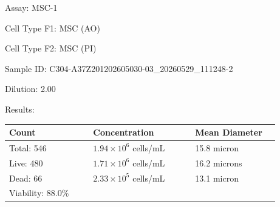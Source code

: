 \documentclass[UTF8,10pt,a4paper,fontset=fandol]{ctexart}
\newcommand{\fieldvalue}[1]{#1}
\begin{document}
\newpage

\noindent
Assay: 
\fieldvalue{MSC-1}

\medskip
\noindent
Cell Type F1: 
\fieldvalue{MSC (AO)}

\noindent
Cell Type F2: 
\fieldvalue{MSC (PI)}

\medskip
\noindent
Sample ID: 
\fieldvalue{C304-A37Z201202605030-03\_20260529\_111248-2}

\noindent
Dilution: 
\fieldvalue{2.00}

\medskip
\noindent
Results:

\medskip
\noindent
\begin{tabular}{@{}p{0.28\linewidth}p{0.34\linewidth}p{0.28\linewidth}@{}}
\textbf{Count} & \textbf{Concentration} & \textbf{Mean Diameter} \\
\hline
Total:
\fieldvalue{546}
&
\fieldvalue{$1.94\times10^{6}$ cells/mL}
&
\fieldvalue{15.8 micron}
\\[2pt]
Live:
\fieldvalue{480}
&
\fieldvalue{$1.71\times10^{6}$ cells/mL}
&
\fieldvalue{16.2 microns}
\\[2pt]
Dead:
\fieldvalue{66}
&
\fieldvalue{$2.33\times10^{5}$ cells/mL}
&
\fieldvalue{13.1 micron}
\\[2pt]
Viability:
\fieldvalue{88.0\%}
&
&
\end{tabular}

\medskip
\end{document}
